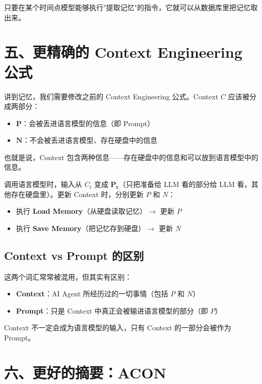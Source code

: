 \documentclass[12pt,a4paper]{article}
\begin{document}
只要在某个时间点模型能够执行"提取记忆"的指令，它就可以从数据库里把记忆取出来。

\section{五、更精确的 Context Engineering 公式}

讲到记忆，我们需要修改之前的 Context Engineering 公式。Context $C$ 应该被分成两部分：

\begin{itemize}[leftmargin=2em]
  \item $\mathbf{P}$：会被丢进语言模型的信息（即 Prompt）
  \item $\mathbf{N}$：不会被丢进语言模型、存在硬盘中的信息
\end{itemize}

也就是说，Context 包含两种信息——存在硬盘中的信息和可以放到语言模型中的信息。

调用语言模型时，输入从 $C_t$ 变成 $\mathbf{P_t}$（只把准备给 LLM 看的部分给 LLM 看，其他存在硬盘里）。更新 Context 时，分别更新 $P$ 和 $N$：

\begin{itemize}[leftmargin=2em]
  \item 执行 \textbf{Load Memory}（从硬盘读取记忆）$\rightarrow$ 更新 $P$
  \item 执行 \textbf{Save Memory}（把记忆存到硬盘）$\rightarrow$ 更新 $N$
\end{itemize}

\subsection{Context vs Prompt 的区别}

这两个词汇常常被混用，但其实有区别：

\begin{itemize}[leftmargin=2em]
  \item \textbf{Context}：AI Agent 所经历过的一切事情（包括 $P$ 和 $N$）
  \item \textbf{Prompt}：只是 Context 中真正会被输进语言模型的部分（即 $P$）
\end{itemize}

Context 不一定会成为语言模型的输入，只有 Context 的一部分会被作为 Prompt。

\section{六、更好的摘要：ACON}
\end{document}
